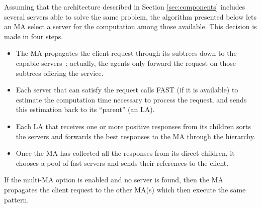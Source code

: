 Assuming that the architecture described in Section
\ref{sec:components} includes several servers able to solve the same
problem, the algorithm presented below lets an MA select a server
for the computation among those available. This decision is made in
four steps.




\begin{itemize}
\item The MA propagates the client request through its subtrees down
  to the capable servers~; actually, the agents only forward the
  request on those subtrees offering the service.
\item Each server that can satisfy the request calls FAST (if it is
  available) to estimate the computation time necessary to process the
  request, and sends this estimation back to its ``parent'' (an LA).
\item Each LA that receives one or more positive responses from its
  children sorts the servers and forwards the best responses to the MA
  through the hierarchy.
\item Once the MA has collected all the responses from its direct
  children, it chooses a pool of fast servers and sends their
  references to the client.
\end{itemize}

If the multi-MA option is enabled and no server is found, then the MA
propagates the client request to the other MA(s) which then execute
the same pattern.


